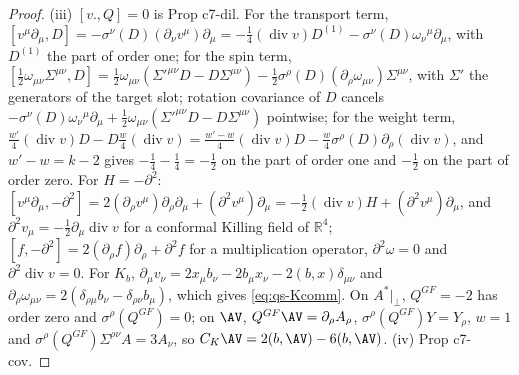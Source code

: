\begin{proof}
(iii) $[v.,Q]=0$ is Prop c7-dil. For the transport term, $[v^\mu\partial_\mu,D]=-\sigma^\nu(D)(\partial_\nu v^\mu)\partial_\mu=-\tfrac14(\operatorname{div}v)D^{(1)}-\sigma^\nu(D)\omega_\nu{}^\mu\partial_\mu$, with $D^{(1)}$ the part of order one; for the spin term, $[\tfrac12\omega_{\mu\nu}\Sigma^{\mu\nu},D]=\tfrac12\omega_{\mu\nu}(\Sigma'^{\mu\nu}D-D\Sigma^{\mu\nu})-\tfrac12\sigma^\rho(D)(\partial_\rho\omega_{\mu\nu})\Sigma^{\mu\nu}$, with $\Sigma'$ the generators of the target slot; rotation covariance of $D$ cancels $-\sigma^\nu(D)\omega_\nu{}^\mu\partial_\mu+\tfrac12\omega_{\mu\nu}(\Sigma'^{\mu\nu}D-D\Sigma^{\mu\nu})$ pointwise; for the weight term, $\tfrac{w'}4(\operatorname{div}v)D-D\tfrac w4(\operatorname{div}v)=\tfrac{w'-w}4(\operatorname{div}v)D-\tfrac w4\sigma^\rho(D)\partial_\rho(\operatorname{div}v)$, and $w'-w=k-2$ gives $-\tfrac14-\tfrac14=-\tfrac12$ on the part of order one and $-\tfrac12$ on the part of order zero. For $H=-\partial^2$: $[v^\mu\partial_\mu,-\partial^2]=2(\partial_\rho v^\mu)\partial_\rho\partial_\mu+(\partial^2v^\mu)\partial_\mu=-\tfrac12(\operatorname{div}v)H+(\partial^2v^\mu)\partial_\mu$, and $\partial^2v_\mu=-\tfrac12\partial_\mu\operatorname{div}v$ for a conformal Killing field of $\mathbb R^4$; $[f,-\partial^2]=2(\partial_\rho f)\partial_\rho+\partial^2f$ for a multiplication operator, $\partial^2\omega=0$ and $\partial^2\operatorname{div}v=0$. For $K_b$, $\partial_\mu v_\nu=2x_\mu b_\nu-2b_\mu x_\nu-2(b,x)\delta_{\mu\nu}$ and $\partial_\rho\omega_{\mu\nu}=2(\delta_{\rho\mu}b_\nu-\delta_{\rho\nu}b_\mu)$, which gives \eqref{eq:qs-Kcomm}. On $A^*|_\perp$, $Q^{GF}=-2$ has order zero and $\sigma^\rho(Q^{GF})=0$; on $\AV$, $Q^{GF}\AV=\partial_\rho A_\rho$, $\sigma^\rho(Q^{GF})Y=Y_\rho$, $w=1$ and $\sigma^\rho(Q^{GF})\Sigma^{\rho\nu}A=3A_\nu$, so $C_K\AV=2(b,\AV)-6(b,\AV)$. (iv) Prop c7-cov.
\end{proof}

